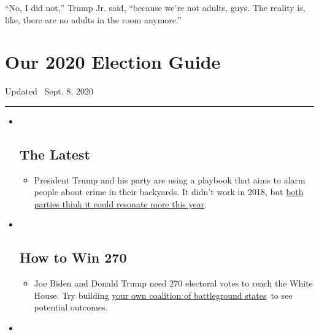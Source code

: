 ``No, I did not,'' Trump Jr. said, ``because we're not adults, guys. The
reality is, like, there are no adults in the room anymore.''

\hypertarget{our-2020-election-guide}{%
\section{Our 2020 Election Guide}\label{our-2020-election-guide}}

Updated ~Sept. 8, 2020

\begin{center}\rule{0.5\linewidth}{\linethickness}\end{center}

\begin{itemize}
\item ~
  \hypertarget{the-latest}{%
  \subsection{The Latest}\label{the-latest}}

  \begin{itemize}
  \item
    President Trump and his party are using a playbook that aims to
    alarm people about crime in their backyards. It didn't work in 2018,
    but
    \href{https://www.nytimes3xbfgragh.onion/2020/09/08/us/politics/trump-republicans-fear-strategy.html?action=click\&pgtype=Article\&state=default\&region=BELOW_MAIN_CONTENT\&context=storylines_guide}{both
    parties think it could resonate more this year}.
  \end{itemize}
\item ~
  \hypertarget{how-to-win-270}{%
  \subsection{How to Win 270}\label{how-to-win-270}}

  \begin{itemize}
  \item
    Joe Biden and Donald Trump need 270 electoral votes to reach the
    White House. Try building
    \href{https://www.nytimes3xbfgragh.onion/interactive/2020/us/elections/election-states-biden-trump.html?action=click\&pgtype=Article\&state=default\&region=BELOW_MAIN_CONTENT\&context=storylines_guide}{your
    own coalition of battleground states}~to see potential outcomes.
  \end{itemize}
\item ~
  \hypertarget{voting-by-mail}{%
}
\end{itemize}
